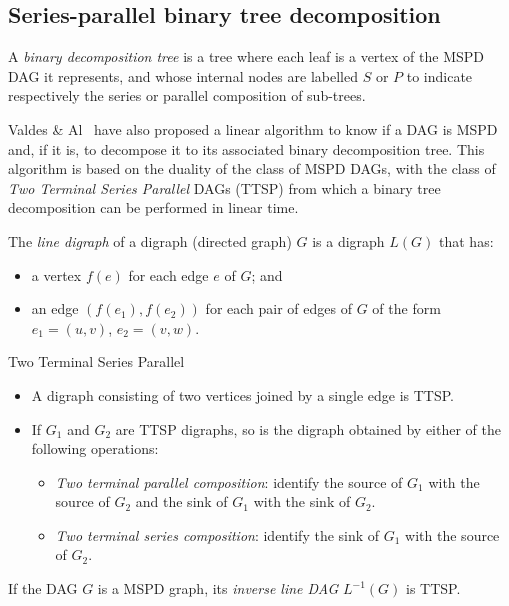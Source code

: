 \subsection{Series-parallel binary tree decomposition}
A \emph{binary decomposition tree} is a tree where each leaf is a vertex of the MSPD DAG it represents, and whose internal nodes are labelled $S$ or $P$ to indicate respectively the series or parallel composition of sub-trees.

Valdes \& Al~\cite{Valdes:1979:RSP:800135.804393} have also proposed a linear algorithm to know if a DAG is MSPD and, if it is, to decompose it to its associated binary decomposition tree. This algorithm is based on the duality of the class of MSPD DAGs, with the class of \emph{Two Terminal Series Parallel} DAGs (TTSP) from which a binary tree decomposition can be performed in linear time. 

\begin{mydef}
The \emph{line digraph} of a digraph (directed graph) $G$ is a digraph $L(G)$ that has:
\begin{itemize}
\item a vertex $f(e)$ for each edge $e$ of $G$; and
\item an edge $(f(e_1),f(e_2))$ for each pair of edges of $G$ of the form $e_1=(u,v)$, $e_2=(v,w)$.
\end{itemize}
\end{mydef}

\begin{mydef}Two Terminal Series Parallel
\begin{itemize}
\item A digraph consisting of two vertices joined by a single edge is TTSP.
\item If $G_1$ and $G_2$ are TTSP digraphs, so is the digraph obtained by either of the following operations:
\begin{itemize}
\item \emph{Two terminal parallel composition}: identify the source of $G_1$ with the source of $G_2$ and the sink of $G_1$ with the sink of $G_2$.
\item \emph{Two terminal series composition}: identify the sink of $G_1$ with the source of $G_2$.
\end{itemize}
\end{itemize}
\end{mydef}

\begin{myth}
If the DAG $G$ is a MSPD graph, its \emph{inverse line DAG} $L^{-1}(G)$ is TTSP.
\end{myth}

